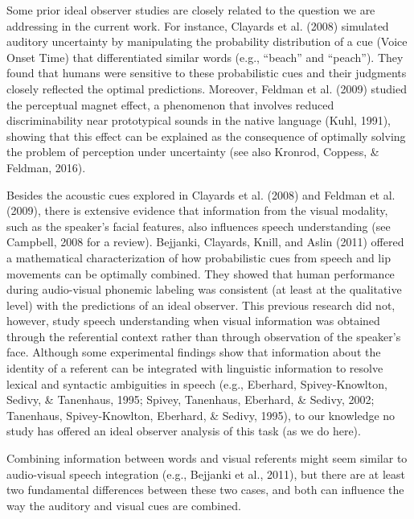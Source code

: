 \documentclass[english,,man,floatsintext]{apa6}
\theoremstyle{definition}
\theoremstyle{definition}
\theoremstyle{definition}
\theoremstyle{remark}
\begin{document}
Some prior ideal observer studies are closely related to the question we
are addressing in the current work. For instance, Clayards et al. (2008)
simulated auditory uncertainty by manipulating the probability
distribution of a cue (Voice Onset Time) that differentiated similar
words (e.g., \enquote{beach} and \enquote{peach}). They found that
humans were sensitive to these probabilistic cues and their judgments
closely reflected the optimal predictions. Moreover, Feldman et al.
(2009) studied the perceptual magnet effect, a phenomenon that involves
reduced discriminability near prototypical sounds in the native language
(Kuhl, 1991), showing that this effect can be explained as the
consequence of optimally solving the problem of perception under
uncertainty (see also Kronrod, Coppess, \& Feldman, 2016).

Besides the acoustic cues explored in Clayards et al. (2008) and Feldman
et al. (2009), there is extensive evidence that information from the
visual modality, such as the speaker's facial features, also influences
speech understanding (see Campbell, 2008 for a review). Bejjanki,
Clayards, Knill, and Aslin (2011) offered a mathematical
characterization of how probabilistic cues from speech and lip movements
can be optimally combined. They showed that human performance during
audio-visual phonemic labeling was consistent (at least at the
qualitative level) with the predictions of an ideal observer. This
previous research did not, however, study speech understanding when
visual information was obtained through the referential context rather
than through observation of the speaker's face. Although some
experimental findings show that information about the identity of a
referent can be integrated with linguistic information to resolve
lexical and syntactic ambiguities in speech (e.g., Eberhard,
Spivey-Knowlton, Sedivy, \& Tanenhaus, 1995; Spivey, Tanenhaus,
Eberhard, \& Sedivy, 2002; Tanenhaus, Spivey-Knowlton, Eberhard, \&
Sedivy, 1995), to our knowledge no study has offered an ideal observer
analysis of this task (as we do here).

Combining information between words and visual referents might seem
similar to audio-visual speech integration (e.g., Bejjanki et al.,
2011), but there are at least two fundamental differences between these
two cases, and both can influence the way the auditory and visual cues
are combined.
\end{document}

